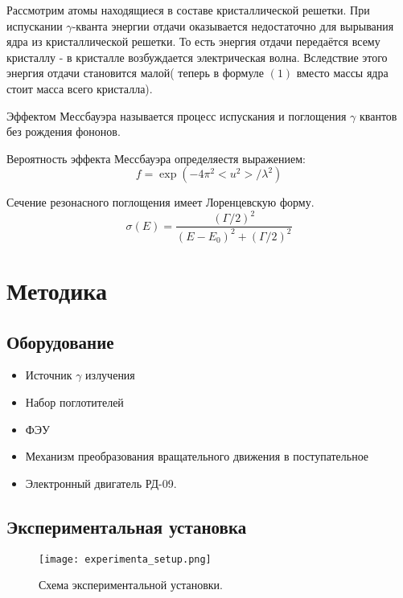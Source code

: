 \documentclass[a4paper, 14pt]{article}
\begin{document}
Рассмотрим атомы находящиеся в составе кристаллической решетки. 
При испускании $\gamma$-кванта энергии отдачи оказывается недостаточно
для вырывания ядра из кристаллической решетки. То есть энергия отдачи 
передаётся всему кристаллу - в кристалле возбуждается электрическая волна.
Вследствие этого энергия отдачи становится малой( теперь в формуле $(1)$ 
вместо массы ядра стоит масса всего кристалла).

\textcolor{defenition}{Эффектом Мессбауэра} называется процесс испускания 
и поглощения $\gamma$ квантов без рождения фононов. 

Вероятность эффекта Мессбауэра определяестя выражением:
\begin{equation}
f = \operatorname{exp}(-4 \pi^{2} <u^{2}> / \lambda^{2})
\end{equation}

Сечение резонасного поглощения имеет Лоренцевскую форму.
\begin{equation}
    \sigma(E) = \frac{(\Gamma / 2)^{2}}{(E - E_{0})^{2} + (\Gamma / 2)^{2}}
    \label{lorenz}
\end{equation}

\section*{\textcolor{header}{Методика}}
\subsection*{\textcolor{sub_header}{Оборудование}}
\begin{itemize}
    \item Источник $\gamma$ излучения
    \item Набор поглотителей
    \item ФЭУ 
    \item Механизм преобразования вращательного движения в поступательное
    \item Электронный двигатель РД-09.
\end{itemize}

\subsection*{\textcolor{sub_header}{Экспериментальная установка}}

\begin{figure}[hbtp]
    \begin{center}
        \texttt{[image: experimenta\_setup.png]}
        \caption{Схема экспериментальной установки.}
        \label{fig:experimental_setup}
    \end{center}
\end{figure}
\end{document}
